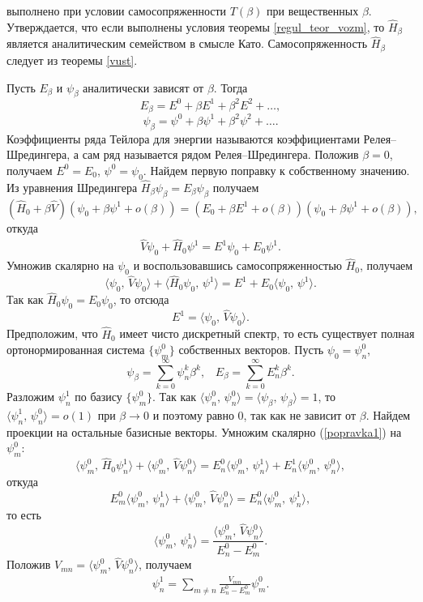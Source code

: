 \documentclass[a4paper
]{article}
\begin{document}
выполнено при условии самосопряженности $T(\beta)$ при вещественных $\beta$.
Утверждается, что если выполнены условия теоремы \ref{regul_teor_vozm},
то $\hat H_\beta$ является аналитическим семейством в смысле Като.
Самосопряженность $\hat H_\beta$ следует из теоремы \ref{vust}. \par
Пусть $E_\beta$ и $\psi_\beta$ аналитически зависят от $\beta$. Тогда
$$E_\beta=E^0+\beta E^1+\beta^2E^2+\dots,$$ $$\psi_\beta=\psi^0+\beta
\psi^1+\beta^2\psi^2+\dots .$$ Коэффициенты ряда Тейлора для энергии
называются коэффициентами Релея--Шредингера, а сам ряд называется рядом
Релея--Шредингера. Положив $\beta=0$, получаем $E^0=E_0$,
$\psi^0=\psi_0$. Найдем первую поправку к собственному значению.
Из уравнения Шредингера $\hat H_\beta\psi_\beta=E_\beta\psi_\beta$
получаем $$(\hat H_0+\beta \hat V)(\psi_0+\beta \psi^1+o(\beta))=
(E_0+\beta E^1+o(\beta))(\psi_0+\beta \psi^1+o(\beta)),$$ откуда
\begin{align}
\label{popravka1}
\hat V\psi_0+\hat H_0\psi^1=E^1\psi_0+E_0\psi^1.
\end{align}
Умножив скалярно
на $\psi_0$ и воспользовавшись самосопряженностью $\hat H_0$, получаем
$$\langle \psi_0, \, \hat V\psi_0\rangle+\langle \hat H_0\psi_0, \, \psi^1
\rangle=E^1+E_0\langle \psi_0, \, \psi^1\rangle.$$ Так как
$\hat H_0\psi_0=E_0\psi_0$, то отсюда $$E^1=\langle \psi_0, \, \hat V\psi_0\rangle.$$
Предположим, что $\hat H_0$ имеет чисто дискретный спектр, то есть
существует полная ортонормированная система $\{\psi_m^0\}$ собственных
векторов. Пусть $\psi_0=\psi_n^0$, $$\psi_\beta=\sum \limits_{k=0}^\infty
\psi^k_n\beta^k, \;\;\; E_\beta=\sum \limits_{k=0}^\infty E^k_n\beta^k.$$
Разложим $\psi_n^1$ по базису
$\{\psi_m^0\}$. Так как $\langle \psi_n^0, \, \psi_n^0\rangle=\langle
\psi_\beta, \, \psi_\beta\rangle=1$, то $\langle \psi_n^1, \,
\psi_n^0\rangle=o(1)$ при $\beta\rightarrow 0$ и поэтому равно 0, так
как не зависит от $\beta$. Найдем проекции на остальные базисные векторы.
Умножим скалярно (\ref{popravka1}) на $\psi_m^0$: $$\langle \psi^0_m, \,
\hat H_0\psi^1_n\rangle+\langle \psi_m^0, \, \hat V\psi_n^0\rangle=E^0_n
\langle \psi_m^0, \, \psi_n^1\rangle+E_n^1\langle \psi_m^0, \, \psi_n^0
\rangle,$$ откуда $$E_m^0\langle \psi_m^0, \, \psi_n^1\rangle+\langle
\psi_m^0, \, \hat V\psi_n^0\rangle=E_n^0\langle \psi_m^0, \, \psi_n^1
\rangle,$$ то есть $$\langle \psi_m^0, \, \psi_n^1\rangle=\frac{
\langle \psi_m^0, \, \hat V\psi_n^0\rangle}{E_n^0-E_m^0}.$$ Положив
$V_{mn}=\langle \psi_m^0, \, \hat V\psi_n^0\rangle$, получаем
\begin{align}
\label{vec_popr1}
\psi_n^1=\sum \limits_{m\ne n}\frac{V_{mn}}{E^0_n-E^0_m}
\psi_m^0.
\end{align}
\end{document}
